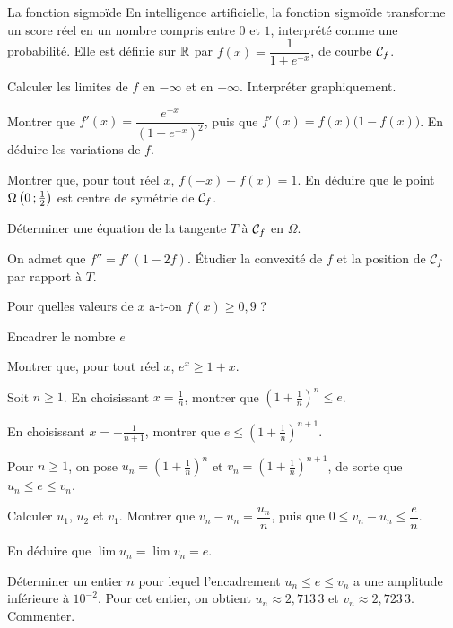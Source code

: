 \begin{exercice}[3]{La fonction sigmoïde}
En intelligence artificielle, la fonction sigmoïde transforme un score réel en un nombre compris entre $0$ et $1$, interprété
comme une probabilité. Elle est définie sur $\mathbb{R}$ par $f(x)=\dfrac{1}{1+e^{-x}}$, de courbe $\mathcal{C}_f$.
\begin{questions}
  \item Calculer les limites de $f$ en $-\infty$ et en $+\infty$. Interpréter graphiquement.
  \item Montrer que $f'(x)=\dfrac{e^{-x}}{\left(1+e^{-x}\right)^{2}}$, puis que $f'(x)=f(x)\big(1-f(x)\big)$. En déduire les variations de $f$.
  \item Montrer que, pour tout réel $x$, $f(-x)+f(x)=1$. En déduire que le point $\Omega\left(0\,{;}\,\frac12\right)$ est centre de symétrie de $\mathcal{C}_f$.
  \item Déterminer une équation de la tangente $T$ à $\mathcal{C}_f$ en $\Omega$.
  \item On admet que $f''=f'\,(1-2f)$. Étudier la convexité de $f$ et la position de $\mathcal{C}_f$ par rapport à $T$.
  \item Pour quelles valeurs de $x$ a-t-on $f(x)\geq0{,}9$ ?
\end{questions}
\end{exercice}

\begin{exercice}[3]{Encadrer le nombre $e$}
\begin{questions}
  \item Montrer que, pour tout réel $x$, $e^{x}\geq1+x$.
  \item Soit $n\geq1$. En choisissant $x=\frac1n$, montrer que $\left(1+\frac1n\right)^{n}\leq e$.
  \item En choisissant $x=-\frac{1}{n+1}$, montrer que $e\leq\left(1+\frac1n\right)^{n+1}$.
\end{questions}
Pour $n\geq1$, on pose $u_n=\left(1+\frac1n\right)^{n}$ et $v_n=\left(1+\frac1n\right)^{n+1}$, de sorte que $u_n\leq e\leq v_n$.
\begin{questions}[resume]
  \item Calculer $u_1$, $u_2$ et $v_1$. Montrer que $v_n-u_n=\dfrac{u_n}{n}$, puis que $0\leq v_n-u_n\leq\dfrac en$.
  \item En déduire que $\lim u_n=\lim v_n=e$.
  \item Déterminer un entier $n$ pour lequel l'encadrement $u_n\leq e\leq v_n$ a une amplitude inférieure à $10^{-2}$. Pour cet
    entier, on obtient $u_n\approx2{,}713\,3$ et $v_n\approx2{,}723\,3$. Commenter.
\end{questions}
\end{exercice}

